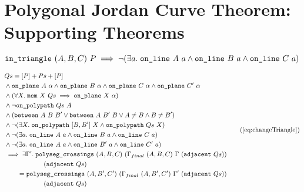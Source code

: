 \chapter{Polygonal Jordan Curve Theorem: Supporting Theorems}\label{app:JordanVerificationExtra}

\begin{equation}\label{eq:inTriangleNcol}
\texttt{in\_triangle}\ (A,B,C)\ P \implies \neg(\exists a.\; \texttt{on\_line}\ A\ a\wedge \texttt{on\_line}\ B\ a\wedge \texttt{on\_line}\ C\ a)
\end{equation}

\begin{equation}
\begin{aligned}
    &Qs = \append{[P]}{\append{Ps}{[P]}}\\
    &\wedge \code{on\_plane}\ A\ \alpha \wedge \code{on\_plane}\ B\ \alpha \wedge \code{on\_plane}\ C\ \alpha \wedge \code{on\_plane}\ C'\ \alpha\\
    &\wedge(\forall X.\; \code{mem}\ X\ Qs \implies \code{on\_plane}\ X\ \alpha)\\
    &\wedge\neg\code{on\_polypath}\ Qs\ A\\
    &\wedge (\between{A}{B}{B'} \vee \between{A}{B'}{B} \vee A\neq B \wedge B\neq B')\\
    &\wedge \neg(\exists X.\; \code{on\_polypath}\ [B,B']\ X \wedge \code{on\_polypath}\ Qs\ X)\\
    &\wedge\Triangle{a}{A}{B}{C}\\
    &\wedge \Triangle{a}{A}{B'}{C'}\\
    &\implies \exists \Gamma'.\; \code{polyseg\_crossings}\ (A,B,C)\ (\Gamma_{final}\ (A,B,C)\ \Gamma\ (\code{adjacent}\ Qs))\\
    &\qquad\qquad\qquad(\code{adjacent}\ Qs)\\
    &\qquad = \code{polyseg\_crossings}\ (A,B',C')\ (\Gamma_{final}\ (A,B',C')\ \Gamma'\ (\code{adjacent}\ Qs))\\
    &\qquad\qquad\qquad(\code{adjacent}\ Qs)\\
\end{aligned}\tag{\ref{eq:changeTriangle}}
\end{equation}

